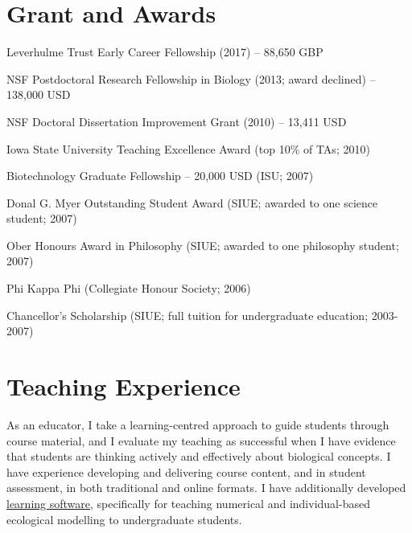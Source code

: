 \documentclass[letterpaper]{article}
\renewenvironment{itemize}{
  \begin{list}{}{
    \setlength{\leftmargin}{1.5em}
  }
}{
  \end{list}
}
\begin{document}
\section*{Grant and Awards}
\begin{itemize}
\item Leverhulme Trust Early Career Fellowship (2017) -- 88,650 GBP
\item NSF Postdoctoral Research Fellowship in Biology (2013; award declined) -- 138,000 USD
\item NSF Doctoral Dissertation Improvement Grant (2010) -- 13,411 USD
\item Iowa State University Teaching Excellence Award (top 10\% of TAs; 2010)
\item Biotechnology Graduate Fellowship -- 20,000 USD (ISU; 2007)
\item Donal G. Myer Outstanding Student Award (SIUE; awarded to one science student; 2007)
\item Ober Honours Award in Philosophy (SIUE; awarded to one philosophy student; 2007)
\item Phi Kappa Phi (Collegiate Honour Society; 2006)
\item Chancellor's Scholarship (SIUE; full tuition for undergraduate education; 2003-2007)
\end{itemize}


\section*{Teaching Experience}
\hrulefill


As an educator, I take a learning-centred approach to guide students through course material, and I evaluate my teaching as successful when I have evidence that students are thinking actively and effectively about biological concepts. I have experience developing and delivering course content, and in student assessment, in both traditional and online formats. I have additionally developed \href{https://bradduthie.shinyapps.io/EcoEdu/}{learning software}, specifically for teaching numerical and individual-based ecological modelling to undergraduate students.

\hrulefill

\end{document}
